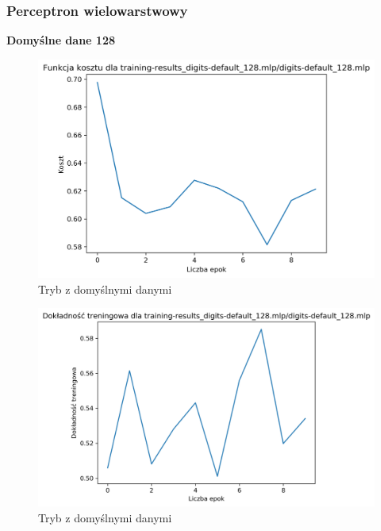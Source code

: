 \documentclass{classrep}
\begin{document}
{{            \subsubsection{Perceptron wielowarstwowy}
            {
                \textbf{Domyślne dane 128}
                \begin{figure}[!htbp]
                    \centering
                    \includegraphics[width=145mm]{wykresy/digits-default_128_mlp_cost.png}
                    \caption{Tryb z domyślnymi danymi}
                \end{figure}
                \begin{figure}[!htbp]
                    \centering
                    \includegraphics[width=155mm]{wykresy/digits-default_128_mlp_training-accuracy.png}
                    \caption{Tryb z domyślnymi danymi}
                \end{figure}
                \begin{figure}[!htbp]
                    \centering

\end{figure}}}}
\end{document}
